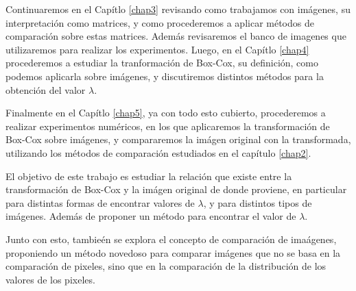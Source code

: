 Continuaremos en el Cap\'itlo \ref{chap3} revisando como trabajamos con im\'agenes, su interpretaci\'on como matrices, y como procederemos a aplicar m\'etodos de comparaci\'on sobre estas matrices. Adem\'as revisaremos el banco de imagenes que utilizaremos para realizar los experimentos. Luego, en el Cap\'itlo \ref{chap4} procederemos a estudiar la tranformaci\'on de Box-Cox, su definici\'on, como podemos aplicarla sobre im\'agenes, y discutiremos distintos m\'etodos para la obtenci\'on del valor $\lambda$. 

Finalmente en el Cap\'itlo \ref{chap5}, ya con todo esto cubierto, procederemos a realizar experimentos num\'ericos, en los que aplicaremos la transformaci\'on de Box-Cox sobre im\'agenes, y compararemos la im\'agen original con la transformada, utilizando los m\'etodos de comparaci\'on estudiados en el cap\'itulo \ref{chap2}.

El objetivo de este trabajo es estudiar la relaci\'on que existe entre la transformaci\'on de Box-Cox y la im\'agen original de donde proviene, en particular para distintas formas de encontrar valores de $\lambda$, y para distintos tipos de im\'agenes. Adem\'as de proponer un m\'etodo para encontrar el valor de $\lambda$.

Junto con esto, tambie\'en se explora el concepto de comparaci\'on de ima\'agenes, proponiendo un m\'etodo novedoso para comparar im\'agenes que no se basa en la comparaci\'on de pixeles, sino que en la comparaci\'on de la distribuci\'on de los valores de los pixeles.